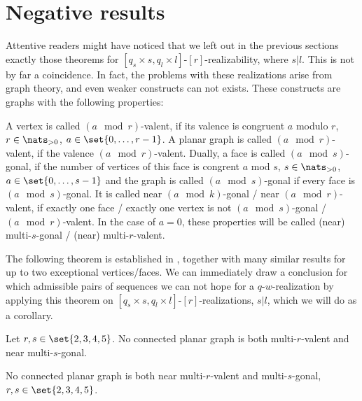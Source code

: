 \section{Negative results}\label{sec:negative:results}

Attentive readers might have noticed that we left out in the previous sections exactly those theorems for $[q_s \times s, q_l \times l]$-$[r]$-realizability, where $s | l$. This is not by far a coincidence. In fact, the problems with these realizations arise from graph theory, and even weaker constructs can not exists. These constructs are graphs with the following properties: 

\begin{definition} A vertex is called $(a \mod r)$-valent, if its valence is congruent $a$ modulo $r$, $r \in \nats_{>0}$, $a \in \set{0, \dots, r - 1}$. A planar graph is called $(a \mod r)$-valent, if the valence $(a \mod r)$-valent. Dually, a face is called $(a \mod s)$-gonal, if the number of vertices of this face is congrent $a$ mod $s$, $s \in \nats_{>0}$, $a \in \set{0, \dots, s - 1}$ and the graph is called $(a \mod s)$-gonal if every face is $(a \mod s)$-gonal. It is called near $(a \mod k)$-gonal / near $(a \mod r)$-valent, if exactly one face / exactly one vertex is not $(a \mod s)$-gonal / $(a \mod r)$-valent. In the case of $a = 0$, these properties will be called (near) multi-$s$-gonal / (near) multi-$r$-valent.
\end{definition}

The following theorem is established in \cite{malkevitch1970properties}, together with many similar results for up to two exceptional vertices/faces. We can immediately draw a conclusion for which admissible pairs of sequences we can not hope for a $q$-$w$-realization by applying this theorem on $[q_s \times s, q_l \times l]$-$[r]$-realizations, $s | l$, which we will do as a corollary.

\begin{theorem}\label{thm:near:regular:nonrealizable} Let $r, s \in \set{2, 3, 4, 5}$. No connected planar graph is both multi-$r$-valent and near multi-$s$-gonal.
\end{theorem}
\begin{corollary} No connected planar graph is both near multi-$r$-valent and multi-$s$-gonal, $r, s \in \set{2, 3, 4, 5}$.
\end{corollary}

